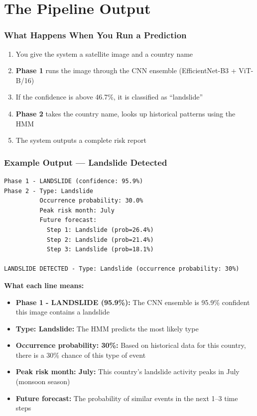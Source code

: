 \documentclass[11pt]{article}
\begin{document}
\part{The Pipeline Output}

\section{What Happens When You Run a Prediction}

\begin{enumerate}
    \item You give the system a satellite image and a country name
    \item \textbf{Phase 1} runs the image through the CNN ensemble (EfficientNet-B3 + ViT-B/16)
    \item If the confidence is above 46.7\%, it is classified as ``landslide''
    \item \textbf{Phase 2} takes the country name, looks up historical patterns using the HMM
    \item The system outputs a complete risk report
\end{enumerate}

\section{Example Output --- Landslide Detected}

\begin{verbatim}
Phase 1 - LANDSLIDE (confidence: 95.9%)
Phase 2 - Type: Landslide
          Occurrence probability: 30.0%
          Peak risk month: July
          Future forecast:
            Step 1: Landslide (prob=26.4%)
            Step 2: Landslide (prob=21.4%)
            Step 3: Landslide (prob=18.1%)

LANDSLIDE DETECTED - Type: Landslide (occurrence probability: 30%)
\end{verbatim}

\textbf{What each line means:}
\begin{itemize}[noitemsep]
    \item \textbf{Phase 1 - LANDSLIDE (95.9\%):} The CNN ensemble is 95.9\% confident this image contains a landslide
    \item \textbf{Type: Landslide:} The HMM predicts the most likely type
    \item \textbf{Occurrence probability: 30\%:} Based on historical data for this country, there is a 30\% chance of this type of event
    \item \textbf{Peak risk month: July:} This country's landslide activity peaks in July (monsoon season)
    \item \textbf{Future forecast:} The probability of similar events in the next 1--3 time steps
\end{itemize}
\end{document}
